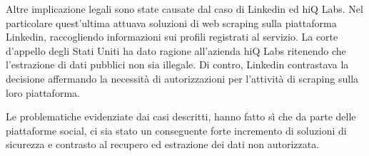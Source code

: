 Altre implicazione legali sono state causate dal caso di Linkedin ed hiQ Labs. Nel particolare quest'ultima attuava soluzioni di web scraping sulla piattaforma Linkedin, raccogliendo informazioni sui profili registrati al servizio. La corte d'appello degli Stati Uniti ha dato ragione all'azienda hiQ Labs ritenendo che l'estrazione di dati pubblici non sia illegale. Di contro, Linkedin contrastava la decisione affermando la necessit\`a di autorizzazioni per l'attivit\`a di scraping sulla loro piattaforma.

Le problematiche evidenziate dai casi descritti, hanno fatto s\`i che da parte delle piattaforme social, ci sia stato un conseguente forte incremento di soluzioni di sicurezza e contrasto al recupero ed estrazione dei dati non autorizzata.



